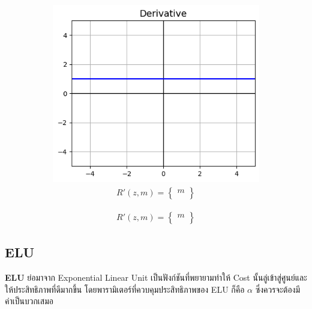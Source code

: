 \begin{figure}[H]
\begin{subfigure}{0.5\textwidth}
      \includegraphics[width=0.9\linewidth]{fig/actfunc_linear_der.png}
      \caption{%
          \begin{equation}
              \begin{split}R'(z,m) =
                  \begin{Bmatrix}
                      m \\
                  \end{Bmatrix}
              \end{split}
          \end{equation}
      }
      \label{fig:actfunc_lin_der}
  \end{subfigure}
\end{figure}

\subsection{ELU}

\textbf{ELU} ย่อมาจาก Exponential Linear Unit เป็นฟังก์ชันที่พยายามทำให้ Cost นั้นลู่เข้าสู่ศูนย์และให้ประสิทธิภาพที่ดีมากขึ้น โดยพารามิเตอร์ที่ควบคุมประสิทธิภาพของ ELU ก็คือ $\alpha$ ซึ่งควรจะต้องมีค่าเป็นบวกเสมอ

